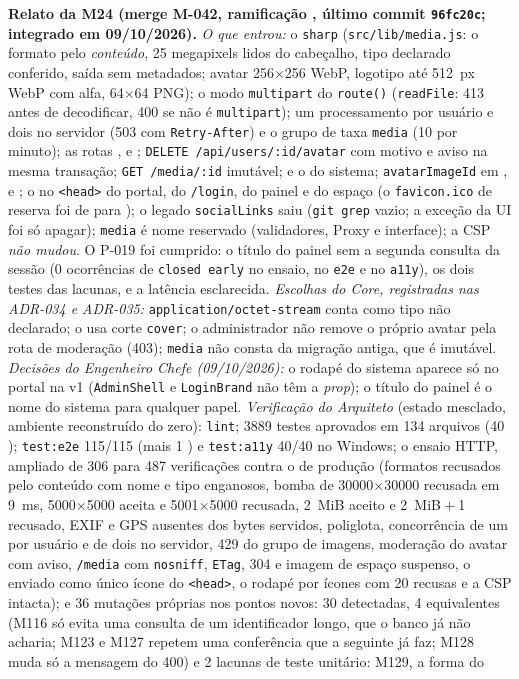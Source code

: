 \noindent{}\quad \textbf{Relato da M24 (merge M-042, ramificação , último commit \texttt{96fc20c}; integrado em 09/10/2026).} \emph{O que entrou:} o \texttt{sharp} (\texttt{src/lib/media.js}: o formato pelo \emph{conteúdo}, 25 megapixels lidos do cabeçalho, tipo declarado conferido, saída sem metadados; avatar 256$\times$256 WebP, logotipo até 512~px WebP com alfa,  64$\times$64 PNG); o modo \texttt{multipart} do \texttt{route()} (\texttt{readFile}: 413 antes de decodificar, 400 se não é \texttt{multipart}); um processamento por usuário e dois no servidor (503  com \texttt{Retry-After}) e o grupo de taxa \texttt{media} (10 por minuto); as rotas ,  e ; \texttt{DELETE /api/users/:id/avatar} com motivo e aviso na mesma transação; \texttt{GET /media/:id} imutável;  e o do sistema; \texttt{avatarImageId} em ,  e ; o  no \texttt{<head>} do portal, do \texttt{/login}, do painel e do espaço (o \texttt{favicon.ico} de reserva foi de  para ); o legado \texttt{socialLinks} saiu (\texttt{git grep} vazio; a exceção da UI foi só apagar); \texttt{media} é nome reservado (validadores, Proxy e interface); a CSP \emph{não mudou}. O P-019 foi cumprido: o título do painel sem a segunda consulta da sessão (0 ocorrências de \texttt{closed early} no ensaio, no \texttt{e2e} e no \texttt{a11y}), os dois testes das lacunas, e a latência esclarecida. \emph{Escolhas do Core, registradas nas ADR-034 e ADR-035:} \texttt{application/octet-stream} conta como tipo não declarado; o  usa corte \texttt{cover}; o administrador não remove o próprio avatar pela rota de moderação (403); \texttt{media} não consta da migração antiga, que é imutável. \emph{Decisões do Engenheiro Chefe (09/10/2026):} o rodapé do sistema aparece só no portal na v1 (\texttt{AdminShell} e \texttt{LoginBrand} não têm a \emph{prop}); o título do painel é o nome do sistema para qualquer papel. \emph{Verificação do Arquiteto} (estado mesclado, ambiente reconstruído do zero): \texttt{lint}; 3889 testes aprovados em 134 arquivos (40 ); \texttt{test:e2e} 115/115 (mais 1 ) e \texttt{test:a11y} 40/40 no Windows; o ensaio HTTP, ampliado de 306 para 487 verificações contra o  de produção (formatos recusados pelo conteúdo com nome e tipo enganosos, bomba de 30000$\times$30000 recusada em 9~ms, 5000$\times$5000 aceita e 5001$\times$5000 recusada, 2~MiB aceito e 2~MiB${}+{}$1 recusado, EXIF e GPS ausentes dos bytes servidos, poliglota, concorrência de um por usuário e de dois no servidor, 429 do grupo de imagens, moderação do avatar com aviso, \texttt{/media} com \texttt{nosniff}, \texttt{ETag}, 304 e imagem de espaço suspenso, o  enviado como único ícone do \texttt{<head>}, o rodapé por ícones com 20 recusas e a CSP intacta); e 36 mutações próprias nos pontos novos: 30 detectadas, 4 equivalentes (M116 só evita uma consulta de um identificador longo, que o banco já não acharia; M123 e M127 repetem uma conferência que a seguinte já faz; M128 muda só a mensagem do 400) e 2 lacunas de teste unitário: M129, a forma do 